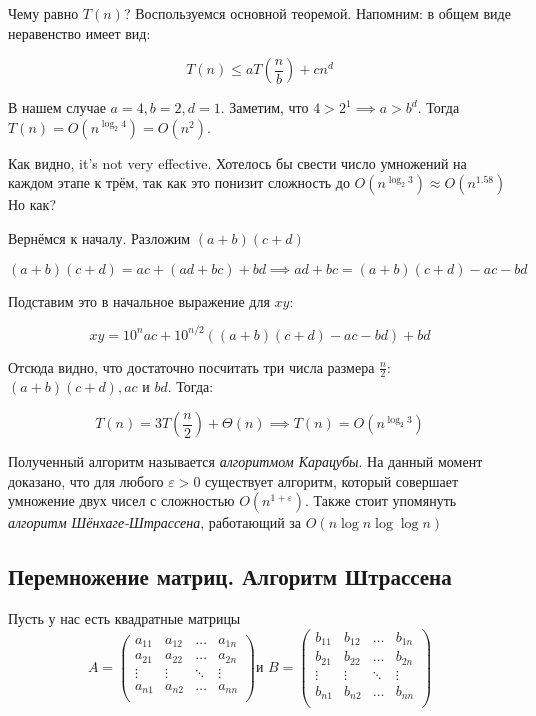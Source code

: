 \documentclass[a4paper,12pt]{article}
\begin{document}
Чему равно \(T(n)\)? Воспользуемся основной теоремой. Напомним: в общем виде неравенство
имеет вид:

\[T(n) \leqslant aT\left( \frac{n}{b} \right) + cn^d\]

В нашем случае \(a = 4, b = 2, d = 1\). Заметим, что \(4 > 2^1 \implies a > b^d\). Тогда \(T(n) = O(n^{\log_2 4}) = O(n^2)\).

Как видно, it’s not very effective. Хотелось бы свести число умножений на каждом этапе к
трём, так как это понизит сложность до \(O(n^{\log_2 3}) \approx O(n^{1.58})\)Но как?

Вернёмся к началу. Разложим \((a + b)(c + d)\)

\[(a+b)(c+d) = ac+(ad+bc) + bd \implies ad + bc = (a + b)(c + d) - ac - bd\]

Подставим это в начальное выражение для \(xy\):

\[xy = 10^{n}ac + 10^{n/2}((a + b)(c + d) - ac - bd)+bd\]

Отсюда видно, что достаточно посчитать три числа размера \(\frac{n}{2}\): \((a + b)(c + d), ac\) и \(bd\). Тогда:

\[T(n) = 3T\left( \frac{n}{2} \right) + \Theta(n) \implies T(n) = O(n^{\log_2 3})\]

Полученный алгоритм называется \emph{алгоритмом Карацубы}.
На данный момент доказано, что для любого $\varepsilon > 0$ существует алгоритм, который совершает умножение двух чисел с сложностью \(O(n^{1 + \varepsilon})\). Также стоит упомянуть \emph{алгоритм Шёнхаге-Штрассена}, работающий за \(O(n \log n \log \log n)\)

\subsection{Перемножение матриц. Алгоритм Штрассена}

Пусть у нас есть квадратные матрицы
\[A = \begin{pmatrix}
a_{11} & a_{12} & \ldots & a_{1n} \\
a_{21} & a_{22} & \ldots & a_{2n} \\
\vdots & \vdots & \ddots & \vdots \\
a_{n1} & a_{n2} & \ldots & a_{nn} \\
\end{pmatrix}
\text{и } 
B = \begin{pmatrix}
b_{11} & b_{12} & \ldots & b_{1n} \\
b_{21} & b_{22} & \ldots & b_{2n} \\
\vdots & \vdots & \ddots & \vdots \\
b_{n1} & b_{n2} & \ldots & b_{nn} \\
\end{pmatrix}\]
\end{document}
